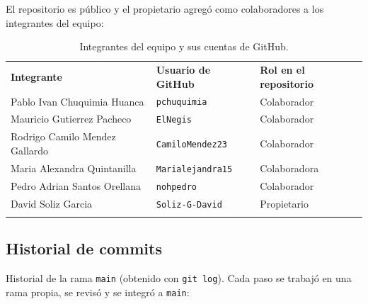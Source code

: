 \documentclass[11pt]{article}
\newcommand{\encab}[1]{{\leavevmode\color{white}\sffamily\bfseries #1}}
\renewcommand{\toprule}{\arrayrulecolor{ucbazul}\specialrule{0.8pt}{0pt}{0pt}\arrayrulecolor{black}}
\renewcommand{\midrule}{\arrayrulecolor{ucbazul}\specialrule{0.4pt}{0pt}{0pt}\arrayrulecolor{black}}
\renewcommand{\bottomrule}{\arrayrulecolor{acento}\specialrule{1.2pt}{0pt}{0pt}\arrayrulecolor{black}}
\begin{document}
El repositorio es público y el propietario agregó como colaboradores a los
integrantes del equipo:

\begin{table}[H]
\centering
\caption{Integrantes del equipo y sus cuentas de GitHub.}
\begin{tabularx}{\textwidth}{X l l}
\toprule
\rowcolor{ucbazul}
\encab{Integrante} & \encab{Usuario de GitHub} & \encab{Rol en el repositorio} \\
\midrule
Pablo Ivan Chuquimia Huanca    & \texttt{pchuquimia}      & Colaborador \\
Mauricio Gutierrez Pacheco     & \texttt{ElNegis}         & Colaborador \\
Rodrigo Camilo Mendez Gallardo & \texttt{CamiloMendez23}  & Colaborador \\
Maria Alexandra Quintanilla    & \texttt{Marialejandra15} & Colaboradora \\
Pedro Adrian Santos Orellana   & \texttt{nohpedro}        & Colaborador \\
David Soliz Garcia             & \texttt{Soliz-G-David}   & Propietario \\
\bottomrule
\end{tabularx}
\end{table}

\subsection{Historial de commits}

Historial de la rama \texttt{main} (obtenido con \texttt{git log}). Cada paso se
trabajó en una rama propia, se revisó y se integró a \texttt{main}:
\end{document}
